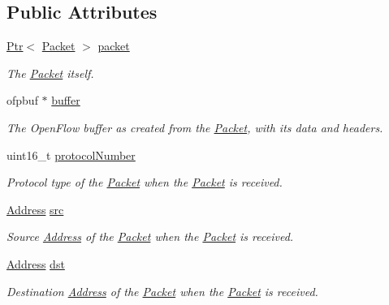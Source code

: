 \subsection*{Public Attributes}
\begin{DoxyCompactItemize}
\item 
\hyperlink{classns3_1_1Ptr}{Ptr}$<$ \hyperlink{classns3_1_1Packet}{Packet} $>$ \hyperlink{structns3_1_1ofi_1_1SwitchPacketMetadata_af65b736eec9acce5f07f3913e2aa1e5d}{packet}
\begin{DoxyCompactList}\small\item\em The \hyperlink{classns3_1_1Packet}{Packet} itself. \end{DoxyCompactList}\item 
ofpbuf $\ast$ \hyperlink{structns3_1_1ofi_1_1SwitchPacketMetadata_ac91341e87ea5d60d4909a30bf851c1c2}{buffer}
\begin{DoxyCompactList}\small\item\em The Open\+Flow buffer as created from the \hyperlink{classns3_1_1Packet}{Packet}, with its data and headers. \end{DoxyCompactList}\item 
uint16\+\_\+t \hyperlink{structns3_1_1ofi_1_1SwitchPacketMetadata_ab30a123047b6798f0658fd5f26995786}{protocol\+Number}
\begin{DoxyCompactList}\small\item\em Protocol type of the \hyperlink{classns3_1_1Packet}{Packet} when the \hyperlink{classns3_1_1Packet}{Packet} is received. \end{DoxyCompactList}\item 
\hyperlink{classns3_1_1Address}{Address} \hyperlink{structns3_1_1ofi_1_1SwitchPacketMetadata_aa9a18c3d3ed379a6caba3b389149e61f}{src}
\begin{DoxyCompactList}\small\item\em Source \hyperlink{classns3_1_1Address}{Address} of the \hyperlink{classns3_1_1Packet}{Packet} when the \hyperlink{classns3_1_1Packet}{Packet} is received. \end{DoxyCompactList}\item 
\hyperlink{classns3_1_1Address}{Address} \hyperlink{structns3_1_1ofi_1_1SwitchPacketMetadata_ab46bf904a1dddf5258af82f6b2b208a4}{dst}
\begin{DoxyCompactList}\small\item\em Destination \hyperlink{classns3_1_1Address}{Address} of the \hyperlink{classns3_1_1Packet}{Packet} when the \hyperlink{classns3_1_1Packet}{Packet} is received. \end{DoxyCompactList}\end{DoxyCompactItemize}


